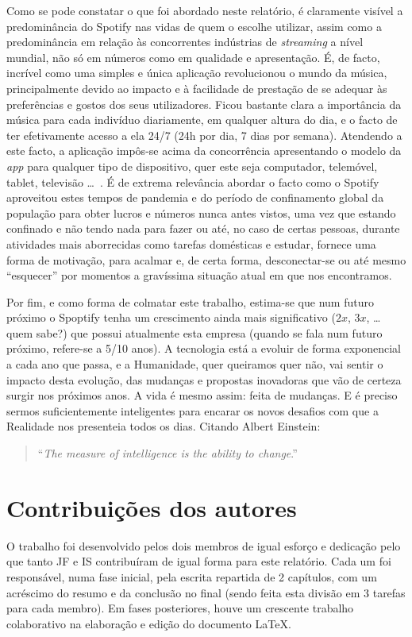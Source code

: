 \documentclass{report}
\begin{document}
Como se pode constatar o que foi abordado neste relatório, é claramente visível a predominância do Spotify nas vidas de quem o escolhe utilizar, assim como a predominância em relação às concorrentes indústrias de \textit{streaming} a nível mundial, não só em números como em qualidade e apresentação. É, de facto, incrível como uma simples e única aplicação revolucionou o mundo da música, principalmente devido ao impacto e à facilidade de prestação de se adequar às preferências e gostos dos seus utilizadores. Ficou bastante clara a importância da música para cada indivíduo diariamente, em qualquer altura do dia, e o facto de ter efetivamente acesso a ela 24/7 (24h por dia, 7 dias por semana). Atendendo a este facto, a aplicação impôs-se acima da concorrência apresentando o modelo da \textit{app} para qualquer tipo de dispositivo, quer este seja computador, telemóvel, tablet, televisão \dots ~\cite{andrewtseng2020}. É de extrema relevância abordar o facto como o Spotify aproveitou estes tempos de pandemia e do período de confinamento global da população para obter lucros e números nunca antes vistos, uma vez que estando confinado e não tendo nada para fazer ou até, no caso de certas pessoas, durante atividades mais aborrecidas como tarefas domésticas e estudar, fornece uma forma de motivação, para acalmar e, de certa forma, desconectar-se ou até mesmo ``esquecer'' por momentos a gravíssima situação atual em que nos encontramos.

Por fim, e como forma de colmatar este trabalho, estima-se que num futuro próximo o Spoptify tenha um crescimento ainda mais significativo ($2x$, $3x$, \dots quem sabe?) que possui atualmente esta empresa (quando se fala num futuro próximo, refere-se a 5/10 anos). A tecnologia está a evoluir de forma exponencial a cada ano que passa, e a Humanidade, quer queiramos quer não, vai sentir o impacto desta evolução, das mudanças e propostas inovadoras que vão de certeza surgir nos próximos anos. A vida é mesmo assim: feita de mudanças. E é preciso sermos suficientemente inteligentes para encarar os novos desafios com que a Realidade nos presenteia todos os dias. Citando Albert Einstein:

\begin{quote}
``\emph{The measure of intelligence is the ability to change}.''    
\end{quote}


\chapter*{Contribuições dos autores}
O trabalho foi desenvolvido pelos dois membros de igual esforço e dedicação pelo que tanto JF e IS contribuíram de igual forma para este relatório.
Cada um foi responsável, numa fase inicial, pela escrita repartida de 2 capítulos, com um acréscimo do resumo e da conclusão no final (sendo feita esta divisão em 3 tarefas para cada membro). Em fases posteriores, houve um crescente trabalho colaborativo na elaboração e edição do documento {\LaTeX}.
\end{document}
